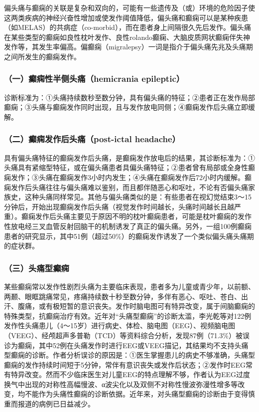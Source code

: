偏头痛与癫痫的关联是复杂和双向的，可能有一些遗传及（或）环境的危险因子使这两类疾病的神经兴奋性增加或使发作阈值降低，偏头痛和癫痫可以是某种疾患（如MELAS）的共病症（co-morbid），而在患者身上间隔很久先后发作。偏头痛在某些类型的癫痫如良性枕叶发作、良性rolando癫痫、大脑皮质网状癫痫伴失神发作等，其发生率偏高。偏癫痫（migralepsy）一词是指介于偏头痛先兆及头痛期之间所发生的癫痫发作。

\subsubsection{（一）癫痫性半侧头痛（hemicrania epileptic）}

诊断标准为：①头痛持续数秒至数分钟，具有偏头痛的特征；②患者正在发作局部癫痫；③头痛与癫痫发作同时出现，且与发作放电同侧；④癫痫发作后头痛立即缓解。

\subsubsection{（二）癫痫发作后头痛（post-ictal headache）}

具有偏头痛特征的癫痫发作后头痛，是癫痫发作放电后的结果，其诊断标准为：①头痛具有紧缩型特征，或在偏头痛患者具偏头痛特征；②患者曾有局部或全身性癫痫发作；③头痛在癫痫发作3小时内发生；④头痛在癫痫发作后72小时内缓解。癫痫发作后头痛往往与偏头痛难以鉴别，而且都伴随恶心和呕吐，不论有否偏头痛家族史，这种头痛同样常见。其他与偏头痛类似的是：有些患者在视幻觉结束3～15分钟后，开始出现癫痫发作后头痛（视觉发作时间越长，头痛时间越长且越严重）。癫痫发作后头痛主要见于原因不明的枕叶癫痫患者，可能是枕叶癫痫的发作性放电经三叉血管反射回脑干的机制诱发了真正的偏头痛。另外，一组100例癫痫患者的研究显示，其中51例（超过50\%）的癫痫发作诱发了一个类似偏头痛头痛期的症状群。

\subsubsection{（三）头痛型癫痫}

某些癫痫常以发作性剧烈头痛为主要临床表现，患者多为儿童或青少年，以前额、两颞、眼眶跳痛常见，疼痛持续数十秒至数分钟，多伴有恶心、呕吐、苍白、出汗、腹痛，或有极短暂的意识丧失。发作时脑电图可有特异改变，属于间脑癫痫的特殊类型，抗癫痫治疗有效。近年对“头痛型癫痫”的诊断太滥，李光乾等对122例发作性头痛患儿（4～15岁）进行病史、体检、脑电图（EEG）、视频脑电图（VEEG）、经颅超声多普勒（TCD）等资料综合分析，发现87例（71.3\%）被误诊为癫痫，其中52例在头痛发作时进行EEG或VEEG描记，其结果均不支持头痛型癫痫的诊断。作者分析误诊的原因是：①医生掌握患儿的病史不够准确，头痛型癫痫的发作持续时间短于5分钟，常伴有意识丧失或发作后状态；②发作时EEG常有特异改变。然而不少临床医生对儿童EEG的特点理解不够，作者认为EEG过度换气中出现的对称性高幅慢波、α波尖化以及双侧不对称性慢波弥漫性增多等改变，均不能作为头痛性癫痫的诊断依据。近年来，对头痛型癫痫的诊断由于变得慎重而报道的病例已日益减少。

